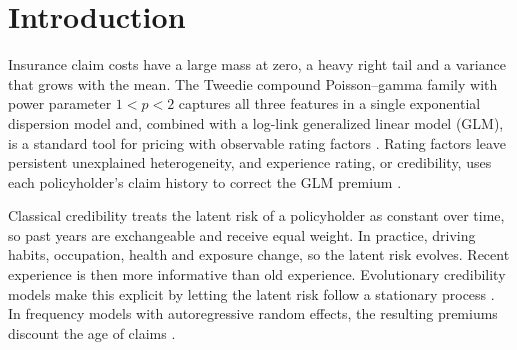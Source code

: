 \documentclass[mathematics,article,submit,moreauthors]{Definitions/mdpi}
\begin{document}
\section{Introduction}\label{sec:intro}

Insurance claim costs have a large mass at zero, a heavy right tail and a variance that grows with the mean. The Tweedie compound Poisson--gamma family with power parameter $1<p<2$ captures all three features in a single exponential dispersion model and, combined with a log-link generalized linear model (GLM), is a standard tool for pricing with observable rating factors \citep{jorgensen1987,jorgensen1994fitting,smyth2002fitting,klugman2019}. Rating factors leave persistent unexplained heterogeneity, and experience rating, or credibility, uses each policyholder's claim history to correct the GLM premium \citep{buhlmann2005course}.

Classical credibility treats the latent risk of a policyholder as constant over time, so past years are exchangeable and receive equal weight. In practice, driving habits, occupation, health and exposure change, so the latent risk evolves. Recent experience is then more informative than old experience. Evolutionary credibility models make this explicit by letting the latent risk follow a stationary process \citep{gerber1975,sundt1981,albrecht1985,buhlmann2005course}. In frequency models with autoregressive random effects, the resulting premiums discount the age of claims \citep{pinquet2001,bolance2003}.
\end{document}
